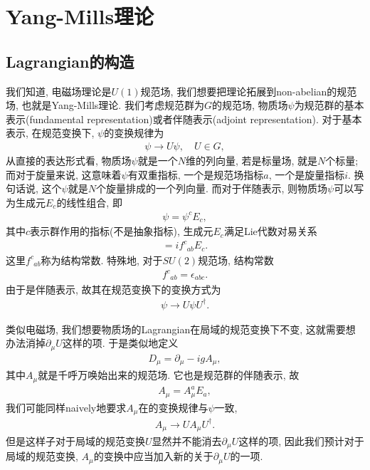 \section{Yang-Mills理论}
\subsection{Lagrangian的构造}
我们知道, 电磁场理论是$U(1)$规范场, 我们想要把理论拓展到non-abelian的规范场, 也就是Yang-Mills理论. 我们考虑规范群为$G$的规范场, 物质场$\psi$为规范群的基本表示(fundamental representation)或者伴随表示(adjoint representation). 对于基本表示, 在规范变换下, $\psi$的变换规律为
\begin{align}
    \psi\to U\psi, \quad U\in G,
\end{align}
从直接的表达形式看, 物质场$\psi$就是一个$N$维的列向量, 若是标量场, 就是$N$个标量; 而对于旋量来说, 这意味着$\psi$有双重指标, 一个是规范场指标$a$, 一个是旋量指标$i$. 换句话说, 这个$\psi$就是$N$个旋量排成的一个列向量. 而对于伴随表示, 则物质场$\psi$可以写为生成元$E_c$的线性组合, 即
\begin{align}
    \psi=\psi^cE_c,
\end{align}
其中$c$表示群作用的指标(不是抽象指标), 生成元$E_c$满足Lie代数对易关系
\begin{align}
    [E_a, E_b]=if^c_{~~ab}E_c.
\end{align}
这里$f^c_{~~ab}$称为结构常数. 特殊地, 对于$SU(2)$规范场, 结构常数
\begin{align}
    f^c_{~~ab}=\epsilon_{abc}.
\end{align}
由于是伴随表示, 故其在规范变换下的变换方式为
\begin{align}
    \psi\to U\psi U^\dagger.
\end{align}

类似电磁场, 我们想要物质场的Lagrangian在局域的规范变换下不变, 这就需要想办法消掉$\partial_\mu U$这样的项. 于是类似地定义
\begin{align}
    D_\mu=\partial_\mu-igA_\mu,
\end{align}
其中$A_\mu$就是千呼万唤始出来的规范场. 它也是规范群的伴随表示, 故
\begin{align}
    A_\mu=A_\mu^aE_a,
\end{align}
我们可能同样naively地要求$A_\mu$在的变换规律与$\psi$一致,
\begin{align}
    A_\mu\to U A_\mu U^\dagger.
\end{align}
但是这样子对于局域的规范变换$U$显然并不能消去$\partial_\mu U$这样的项, 因此我们预计对于局域的规范变换, $A_\mu$的变换中应当加入新的关于$\partial_\mu U$的一项.


